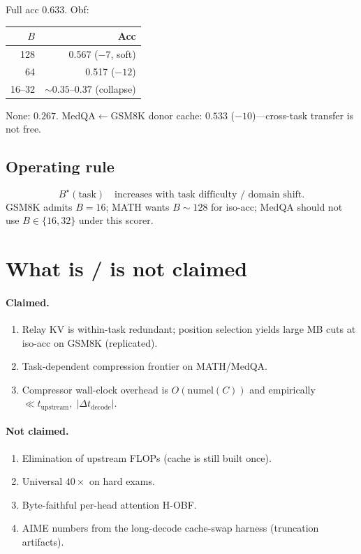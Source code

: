 \documentclass[11pt]{article}
\begin{document}
Full acc $0.633$. Obf:

\begin{center}
\begin{tabular}{@{}rr@{}}
\toprule
$B$ & Acc \\
\midrule
128 & 0.567 ($-7$, soft) \\
64 & 0.517 ($-12$) \\
16--32 & $\sim\!0.35$--$0.37$ (collapse) \\
\bottomrule
\end{tabular}
\end{center}

None: $0.267$. MedQA$\leftarrow$GSM8K donor cache: $0.533$ ($-10$)---cross-task
transfer is not free.

\subsection{Operating rule}
\[
B^\star(\mathrm{task})
  \quad\text{increases with task difficulty / domain shift.}
\]
GSM8K admits $B{=}16$; MATH wants $B\sim 128$ for iso-acc; MedQA should not use
$B\in\{16,32\}$ under this scorer.

\section{What is / is not claimed}

\paragraph{Claimed.}
\begin{enumerate}[leftmargin=1.4em]
\item Relay KV is within-task redundant; position selection yields large MB
cuts at iso-acc on GSM8K (replicated).
\item Task-dependent compression frontier on MATH/MedQA.
\item Compressor wall-clock overhead is $O(\mathrm{numel}(C))$ and empirically
$\ll t_{\mathrm{upstream}},\;|\Delta t_{\mathrm{decode}}|$.
\end{enumerate}

\paragraph{Not claimed.}
\begin{enumerate}[leftmargin=1.4em]
\item Elimination of upstream FLOPs (cache is still built once).
\item Universal $40\times$ on hard exams.
\item Byte-faithful per-head attention H-OBF.
\item AIME numbers from the long-decode cache-swap harness (truncation
artifacts).
\end{enumerate}
\end{document}
